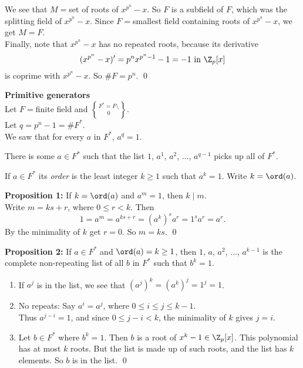 We see that $M={}$set of roots of $x^{p^n}-x$.  So $F$ is a subfield of $F$, which was the splitting field of $x^{p^n}-x$.  Since $F={}$smallest field containing roots of $x^{p^n}-x$, we get $M=F$. \\
Finally, note that $x^{p^n}-x$ has no repeated roots, because its derivative
\[ (x^{p^n}-x)' = p^nx^{p^n-1}-1 = -1 \text{ in } \Z_p[x] \]
is coprime with $x^{p^n}-x$.  So $\#F=p^n$. \qed

\textbf{Primitive generators} \\
Let $F={}$finite field and $F^*=F\setminus\brace0$. \\
Let $q=p^n-1=\#F^*$. \\
We saw that for every $a$ in $F^*$, $a^q=1$.

\thm There is some $a\in F^*$ such that the list $1$, $a^1$, $a^2$, $\dotsc$, $a^{q-1}$ picks up all of $F^*$.

 If $a\in F^*$ its \emph{order} is the least integer $k\geq1$ such that $a^k=1$.  Write $k=\ord(a)$.

\textbf{Proposition 1:} If $k=\ord(a)$ and $a^m=1$, then $k\mid m$. \\
\pf Write $m=ks+r$, where $0\leq r<k$.  Then
\[ 1 = a^m = a^{ks+r} = (a^k)^s a^r = 1^s a^r = a^r . \]
By the minimality of $k$ get $r=0$.  So $m=ks$. \qed

\textbf{Proposition 2:} If $a\in F^*$ and $\ord(a)=k\geq1$, then $1$, $a$, $a^2$, $\dotsc$, $a^{k-1}$ is the complete non-repeating list of all $b$ in $F^*$ such that $b^k=1$. \\
\pf\begin{enumerate}[label=\roman*)]
\item If $a^j$ is in the list, we see that $(a^j)^k=(a^k)^j=1^j=1$.
\item No repeats: Say $a^i=a^j$, where $0\leq i\leq j\leq k-1$. \\
Thus $a^{j-i}=1$, and since $0\leq j-i<k$, the minimality of $k$ gives $j=i$.
\item Let $b\in F^*$ where $b^k=1$.  Then $b$ is a root of $x^k-1\in\Z_p[x]$.  This polynomial has at most $k$ roots.  But the list is made up of such roots, and the list has $k$ elements.  So $b$ is in the list. \qed
\end{enumerate}
